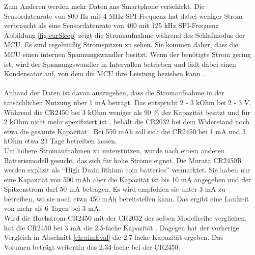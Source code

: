 Zum Anderen werden mehr Daten ans Smartphone verschickt.
Die Sensordatenrate von 800 Hz mit 4 MHz SPI-Frequenz hat dabei weniger Strom verbraucht als eine Sensordatenrate von 400 mit 125 kHz SPI-Frequenz\\
Abbildung \ref{fig:curSleep} zeigt die Stromaufnahme während des Schlafmodus der MCU.
Es sind regelmäßig Stromspitzen zu sehen.
Sie kommen daher, dass die MCU einen internen Spannungswandler besitzt.
Wenn der benötigte Strom gering ist, wird der Spannungswandler in Intervallen betrieben und lädt dabei einen Kondensator auf, von dem die MCU ihre Leistung beziehen kann \cite{site_refreshMode}.\\\\
Anhand der Daten ist davon auszugehen, dass die Stromaufnahme in der tatsächlichen Nutzung über 1 mA beträgt.
Das entspricht 2 - 3 kOhm bei 2 - 3 V.
Während die CR2450 bei 3 kOhm weniger als 90 \% der Kapazität besitzt und für 2 kOhm nicht mehr spezifiziert ist \cite{datasheet_ds6450}, behält die CR2032 bei dem Widerstand noch etwa die gesamte Kapazität \cite{datasheet_ds6032}.
Bei 550 mAh soll sich die CR2450 bei 1 mA und 3 kOhm etwa 23 Tage betreiben lassen.\\
Um höhere Stromaufnahmen zu unterstützen, wurde nach einem anderen Batteriemodell gesucht, das sich für hohe Ströme eignet.
Die Murata CR2450R werden explizit als ``High Drain lithium coin batteries'' \cite{site_murataCr2450r} vermarktet.
Sie haben nur eine Kapazität von 500 mAh aber die Kapazität ist bis 10 mA angegeben und der Spitzenstrom darf 50 mA betragen.
Es wird empfohlen sie unter 3 mA zu betreiben, wo sie noch etwa 450 mAh bereitstellen kann.
Das ergibt eine Laufzeit von mehr als 6 Tagen bei 3 mA. \cite{site_murataCr2450r}\\
Wird die Hochstrom-CR2450 mit der CR2032 der selben Modellreihe verglichen, hat die CR2450 bei 3 mA die 2.5-fache Kapazität \cite{site_murataCr2032r}.
Dagegen hat der vorherige Vergleich in Abschnitt \ref{ch:aimEval} die 2.7-fache Kapazität ergeben.
Das Volumen beträgt weiterhin das 2.34-fache bei der CR2450.

